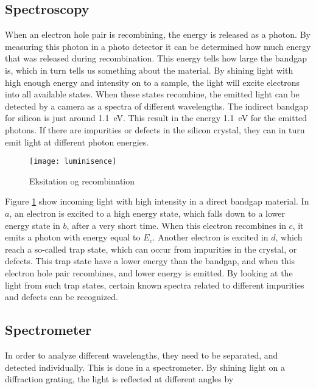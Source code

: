 \subsection{Spectroscopy}

When an electron hole pair is recombining, the energy is released as a photon. By measuring this photon in a photo detector it can be determined how much energy that was released during recombination. This energy tells how large the bandgap is, which in turn tells us something about the material. By shining light with high enough energy and intensity on to a sample, the light will excite electrons into all available states. When these states recombine, the emitted light can be detected by a camera as a spectra of different wavelengths. The indirect bandgap for silicon is just around 1.1~eV. This result in the energy 1.1~eV for the emitted photons. If there are impurities or defects in the silicon crystal, they can in turn emit light at different photon energies.

\begin{figure}[H]
\centering
\texttt{[image: luminisence]}%
\caption{Eksitation og recombination}%
\label{fig:luminescence}%
\end{figure}

Figure \ref{fig:luminescence} show incoming light with high intensity in a direct bandgap material. In $a$, an electron is excited to a high energy state, which falls down to a lower energy state in $b$, after a very short time. When this electron recombines in $c$, it emits a photon with energy equal to $E_c$. Another electron is excited in $d$, which reach a so-called trap state, which can occur from impurities in the crystal, or defects. This trap state have a lower energy than the bandgap, and when this electron hole pair recombines, and lower energy is emitted. By looking at the light from such trap states, certain known spectra related to different impurities and defects can be recognized.

\subsection{Spectrometer}

In order to analyze different wavelengths, they need to be separated, and detected individually. This is done in a spectrometer. By shining light on a diffraction grating, the light is reflected at different angles by

